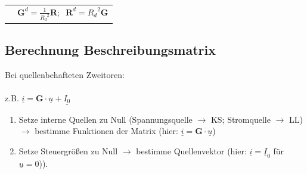\documentclass[a4paper,twocolumn,10pt]{article}
\begin{document}
\begin{tabular}{p{20mm}l}
& $\textbf{G}^d=\frac{1}{{R_d}^2}\textbf{R};\;\;\textbf{R}^d={R_d}^2\textbf{G}$
\end{tabular}

\subsection*{Berechnung Beschreibungsmatrix}
Bei quellenbehafteten Zweitoren:\\\\
z.B. $\underline{i}=\textbf{G}\cdot \underline{u}+\underline{I_0}$
\begin{enumerate}
	\item Setze interne Quellen zu Null (Spannungsquelle $\rightarrow$ KS; Stromquelle $\rightarrow$ LL) $\rightarrow$ bestimme Funktionen der Matrix (hier: $\underline{i}=\textbf{G}\cdot \underline{u}$)
	\item Setze Steuergrößen zu Null $\rightarrow$ bestimme Quellenvektor (hier: $\underline{i}=\underline{I}_0$ für $\underline{u}=0$)).
\end{enumerate}
\end{document}
